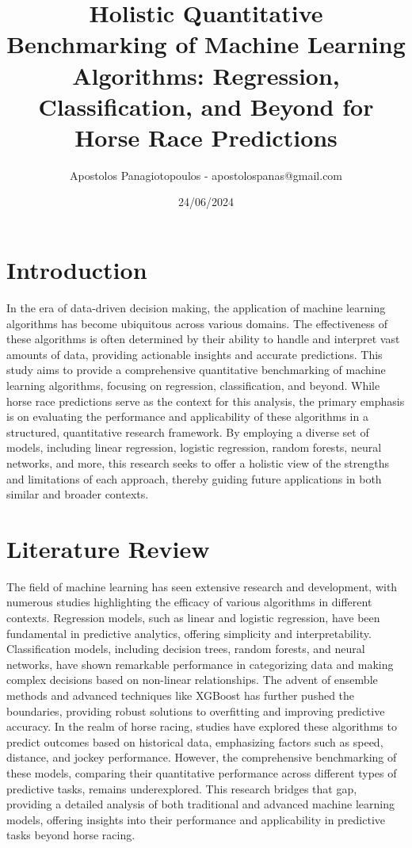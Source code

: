 \documentclass{article}
\title{Holistic Quantitative Benchmarking of Machine Learning Algorithms: Regression, Classification, and Beyond for Horse Race Predictions}
\author{Apostolos Panagiotopoulos - apostolospanas@gmail.com}
\date{24/06/2024}
\begin{document}
\maketitle

\section*{Introduction}
In the era of data-driven decision making, the application of machine learning algorithms has become ubiquitous across various domains. The effectiveness of these algorithms is often determined by their ability to handle and interpret vast amounts of data, providing actionable insights and accurate predictions. This study aims to provide a comprehensive quantitative benchmarking of machine learning algorithms, focusing on regression, classification, and beyond. While horse race predictions serve as the context for this analysis, the primary emphasis is on evaluating the performance and applicability of these algorithms in a structured, quantitative research framework. By employing a diverse set of models, including linear regression, logistic regression, random forests, neural networks, and more, this research seeks to offer a holistic view of the strengths and limitations of each approach, thereby guiding future applications in both similar and broader contexts.

\section*{Literature Review}
The field of machine learning has seen extensive research and development, with numerous studies highlighting the efficacy of various algorithms in different contexts. Regression models, such as linear and logistic regression, have been fundamental in predictive analytics, offering simplicity and interpretability. Classification models, including decision trees, random forests, and neural networks, have shown remarkable performance in categorizing data and making complex decisions based on non-linear relationships. The advent of ensemble methods and advanced techniques like XGBoost has further pushed the boundaries, providing robust solutions to overfitting and improving predictive accuracy. In the realm of horse racing, studies have explored these algorithms to predict outcomes based on historical data, emphasizing factors such as speed, distance, and jockey performance. However, the comprehensive benchmarking of these models, comparing their quantitative performance across different types of predictive tasks, remains underexplored. This research bridges that gap, providing a detailed analysis of both traditional and advanced machine learning models, offering insights into their performance and applicability in predictive tasks beyond horse racing.
\end{document}
